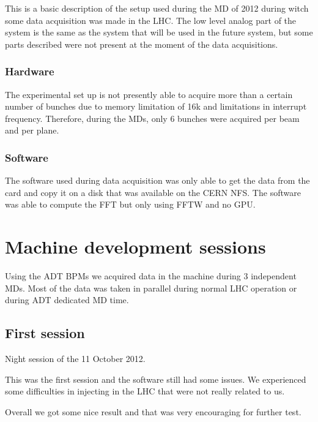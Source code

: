 This is a basic description of the setup used during the \gls{MD} of 2012 during witch some data acquisition was made in the \gls{LHC}. The low level analog part of the system is the same as the system that will be used in the future system, but some parts described were not present at the moment of the data acquisitions.

\subsection{Hardware}

The experimental set up is not presently able to acquire more than a certain number of bunches due to memory limitation of 16k and limitations in interrupt frequency. Therefore, during the \glspl{MD}, only 6 bunches were acquired per beam and per plane.

\subsection{Software}

The software used during data acquisition was only able to get the data from the card and copy it on a disk that was available on the \gls{CERN} \gls{NFS}. The software was able to compute the \gls{FFT} but only using \gls{FFTW} and no \gls{GPU}.

\chapter{Machine development sessions}

Using the \gls{ADT} \glspl{BPM} we acquired data in the machine during 3 independent \glspl{MD}. Most of the data was taken in parallel during normal LHC operation or during \gls{ADT} dedicated \gls{MD} time.

\section{First session}

Night session of the 11 October 2012.

This was the first session and the software still had some issues. We experienced some difficulties in injecting in the \gls{LHC} that were not really related to us.

Overall we got some nice result and that was very encouraging for further test.

